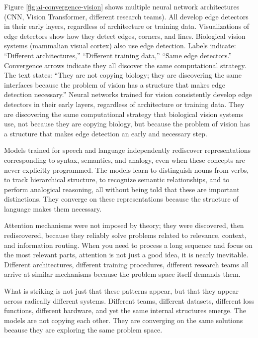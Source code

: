 \documentclass[
  openright]{book}
\begin{document}
Figure \ref{fig:ai-convergence-vision} shows multiple neural network
architectures (CNN, Vision Transformer, different research teams). All
develop edge detectors in their early layers, regardless of architecture
or training data. Visualizations of edge detectors show how they detect
edges, corners, and lines. Biological vision systems (mammalian visual
cortex) also use edge detection. Labels indicate: ``Different
architectures,'' ``Different training data,'' ``Same edge detectors.''
Convergence arrows indicate they all discover the same computational
strategy. The text states: ``They are not copying biology; they are
discovering the same interfaces because the problem of vision has a
structure that makes edge detection necessary.'' Neural networks trained
for vision consistently develop edge detectors in their early layers,
regardless of architecture or training data. They are discovering the
same computational strategy that biological vision systems use, not
because they are copying biology, but because the problem of vision has
a structure that makes edge detection an early and necessary step.

Models trained for speech and language independently rediscover
representations corresponding to syntax, semantics, and analogy, even
when these concepts are never explicitly programmed. The models learn to
distinguish nouns from verbs, to track hierarchical structure, to
recognize semantic relationships, and to perform analogical reasoning,
all without being told that these are important distinctions. They
converge on these representations because the structure of language
makes them necessary.

Attention mechanisms were not imposed by
theory; they were discovered, then rediscovered, because they reliably
solve problems related to relevance, context, and information routing.
When you need to process a long sequence and focus on the most relevant
parts, attention is not just a good idea, it is nearly inevitable.
Different architectures, different training procedures, different
research teams all arrive at similar mechanisms because the problem
space itself demands them.

What is striking is not just that these patterns appear, but that they
appear across radically different systems. Different teams, different
datasets, different loss functions, different hardware, and yet the same
internal structures emerge. The models are not copying each other. They
are converging on the same solutions because they are exploring the same
problem space.
\end{document}
